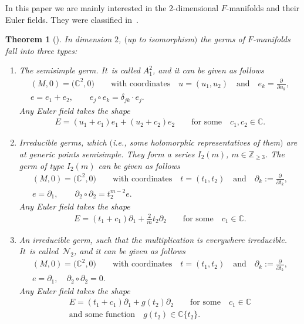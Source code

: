 \documentclass[pdftex]{sigma}%
\numberwithin{equation}{section}
\numberwithin{figure}{section}
\newcommand{\Z}{{\mathbb Z}}
\newcommand{\C}{{\mathbb C}}
\newcommand{\NN}{{\mathcal N}}
\newcommand{\paa}{\partial}
\newtheorem{Theorem}{Theorem}[section]
\begin{document}
In this paper we are mainly interested in the 2-dimensional
$F$-manifolds and their Euler fields.
They were classified in~\cite{He02}.

\begin{Theorem}[{\cite[Theorem~4.7]{He02}}]\label{t2.2}
In dimension $2$, $($up to isomorphism$)$ the germs of
$F$-manifolds fall into three types:
\begin{enumerate}\itemsep=0pt
\item[$(a)$] The semisimple germ. It~is called $A_1^2$,
and it can be given as follows
\begin{gather*}
(M,0)=\big(\C^2,0\big)\qquad\text{with coordinates}\quad
u=(u_1,u_2)\quad\text{and}\quad e_k=\frac{\paa}{\paa u_k},
\\
e= e_1+e_2,\qquad e_j\circ e_k=\delta_{jk}\cdot e_j.
\end{gather*}
Any Euler field takes the shape
\begin{gather}\label{2.3}
E= (u_1+c_1)e_1+(u_2+c_2)e_2\qquad\text{for some}\quad
c_1,c_2\in\C.
\end{gather}

\item[$(b)$] Irreducible germs, which $($i.e., some holomorphic
representatives of them$)$ are at generic points semisimple.
They form a series $I_2(m)$, $m\in\Z_{\geq 3}$.
The germ of type $I_2(m)$ can be given as follows
\begin{gather*}
(M,0)=\big(\C^2,0\big)\qquad \text{with coordinates}\quad t=(t_1,t_2)\quad
\text{and}\quad\paa_k:=\frac{\paa}{\paa t_k},
\\
e=\paa_1,\qquad \paa_2\circ\paa_2 =t_2^{m-2}e.\label{2.4}
\end{gather*}
Any Euler field takes the shape
\begin{gather*}%
E= (t_1+c_1)\paa_1 + \frac{2}{m}t_2\paa_2
\qquad\text{for some}\quad c_1\in\C.
\end{gather*}

\item[$(c)$] An irreducible germ, such that the multiplication is
everywhere irreducible. It~is called~$\NN_2$, and it
can be given as follows
\begin{gather*}
(M,0)=\big(\C^2,0\big)\qquad \text{with coordinates}\quad t=(t_1,t_2)
\quad \text{and}\quad
\paa_k:=\frac{\paa}{\paa t_k},\\
e=\paa_1,\quad \paa_2\circ\paa_2 =0.%
\end{gather*}
Any Euler field takes the shape
\begin{gather}
E= (t_1+c_1)\paa_1 + g(t_2)\paa_2
\qquad\text{for some}\quad c_1\in\C\nonumber
\\
\text{and some function}\quad
g(t_2)\in\C\{t_2\}.\label{2.7}
\end{gather}
\end{enumerate}
\end{Theorem}
\end{document}
